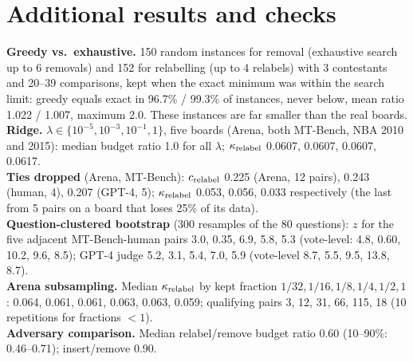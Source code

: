 \documentclass{article}
\newcommand{\nloc}{n_{\rm loc}}
\begin{document}
\section{Additional results and checks}\label{app:robust}
\begin{table}[h]
\caption{$c=k/(z\sqrt{\nloc})$ by adversary: median over pairs with $z\geq1$ or $z\geq2$ (95\% bootstrap interval). NBA has a single pair with $z\geq2$.}
\centering\scriptsize\resizebox{\textwidth}{!}{}
\end{table}
\textbf{Greedy vs.\ exhaustive.} 150 random instances for removal (exhaustive search up to 6 removals) and 152 for relabelling (up to 4 relabels) with 3 contestants and 20--39 comparisons, kept when the exact minimum was within the search limit: greedy equals exact in 96.7\% / 99.3\% of instances, never below, mean ratio 1.022 / 1.007, maximum 2.0. These instances are far smaller than the real boards.\\
\textbf{Ridge.} $\lambda\in\{10^{-5},10^{-3},10^{-1},1\}$, five boards (Arena, both MT-Bench, NBA 2010 and 2015): median budget ratio 1.0 for all $\lambda$; $\kappa_{\rm relabel}$ 0.0607, 0.0607, 0.0607, 0.0617.\\
\textbf{Ties dropped} (Arena, MT-Bench): $c_{\rm relabel}$ 0.225 (Arena, 12 pairs), 0.243 (human, 4), 0.207 (GPT-4, 5); $\kappa_{\rm relabel}$ 0.053, 0.056, 0.033 respectively (the last from 5 pairs on a board that loses 25\% of its data).\\
\textbf{Question-clustered bootstrap} (300 resamples of the 80 questions): $z$ for the five adjacent MT-Bench-human pairs 3.0, 0.35, 6.9, 5.8, 5.3 (vote-level: 4.8, 0.60, 10.2, 9.6, 8.5); GPT-4 judge 5.2, 3.1, 5.4, 7.0, 5.9 (vote-level 8.7, 5.5, 9.5, 13.8, 8.7).\\
\textbf{Arena subsampling.} Median $\kappa_{\rm relabel}$ by kept fraction $1/32,1/16,1/8,1/4,1/2,1$: 0.064, 0.061, 0.061, 0.063, 0.063, 0.059; qualifying pairs 3, 12, 31, 66, 115, 18 (10 repetitions for fractions $<1$).\\
\textbf{Adversary comparison.} Median relabel/remove budget ratio 0.60 (10--90\%: 0.46--0.71); insert/remove 0.90.

\newpage

\end{document}
